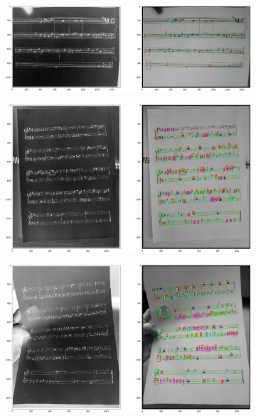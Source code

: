 \documentclass[12pt]{article}
\begin{document}
\begin{enumerate}
\begin{figure}
\begin{subfigure}[b]{0.48\linewidth}
				\end{subfigure}
				\begin{subfigure}[b]{0.48\linewidth}
					\includegraphics[width=\linewidth]{Hard/Zdj6.png}
				\end{subfigure}
				\begin{subfigure}[b]{0.48\linewidth}
					\includegraphics[width=\linewidth]{Hard/Zdj7.png}
				\end{subfigure}
				\begin{subfigure}[b]{0.48\linewidth}
					\includegraphics[width=\linewidth]{Hard/Zdj8.png}
				\end{subfigure}

\end{figure}
\end{enumerate}
\end{document}
